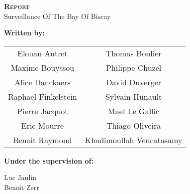 
\begingroup
\thispagestyle{empty}
\begin{center}
\vspace*{2cm}
{\Huge \textsc{\textbf{Report}}}\\


\vspace*{2cm}
{\huge Surveillance Of The Bay Of Biscay}\par %
\end{center}


\vspace*{4cm}
\textbf{\LARGE Written by:} 
\begin{center}
{\LARGE
\begin{tabular}{cc}
Elouan Autret & Thomas Boulier\\
Maxime Bouyssou & Philippe Chuzel\\
Alice Danckaers & David Duverger\\
Raphael Finkelstein & Sylvain Hunault\\
Pierre Jacquot & Mael Le Gallic\\
Eric Mourre & Thiago Oliveira\\
Benoit Raymond & Khadimoullah Vencatasamy\\
\end{tabular}}
\end{center}


\vspace*{1.5 cm}
{\LARGE \textbf{Under the supervision of:}}\\
\begin{center}
{\LARGE
Luc Jaulin\\
Benoit Zerr\\}
\end{center}
\endgroup
